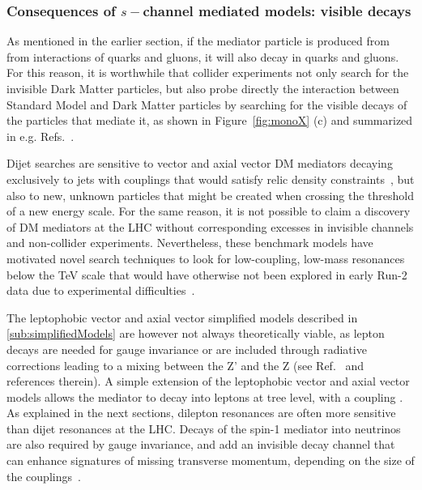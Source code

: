 \subsubsection{Consequences of $s-$channel mediated models: visible decays}
\label{sec:MediatorSearches}

As mentioned in the earlier section, if the mediator particle is produced from from interactions of
quarks and gluons, it will also decay in quarks and gluons. 
For this reason, it is worthwhile that collider experiments not only search for
the invisible Dark Matter particles, but also probe directly the interaction between Standard Model and 
Dark Matter particles by searching for the visible decays of the particles that mediate it, as shown 
in Figure~\ref{fig:monoX} (c) and summarized in e.g. Refs.~\cite{Liew:2016oon,Fairbairn:2016iuf}. 


Dijet searches are sensitive to vector and axial vector DM mediators decaying 
exclusively to jets with couplings that would satisfy relic density constraints~\cite{Chala:2015ama},
but also to new, unknown particles that might be created when crossing 
the threshold of a new energy scale. For the same reason, 
it is not possible to claim a discovery of DM mediators at the LHC without
corresponding excesses in invisible channels and non-collider experiments. 
Nevertheless, these benchmark models have motivated novel search techniques
to look for low-coupling, low-mass resonances below the TeV scale that would
have otherwise not been explored in early Run-2 data due to experimental difficulties~\cite{An:2012ue,Dobrescu:2013coa}. 

The leptophobic vector and axial vector simplified models described in \ref{sub:simplifiedModels} 
are however not always theoretically viable, as lepton decays are needed for gauge invariance
or are included through radiative corrections leading to a mixing between the Z' and the Z 
(see Ref.~\cite{Albert:2017onk} and references therein). A simple extension of the leptophobic vector
and axial vector models allows the mediator to decay into leptons at tree level, with a coupling \gl. 
As explained in the next sections, dilepton resonances are often more sensitive than dijet resonances
at the LHC. Decays of the spin-1 mediator into neutrinos are also required by gauge invariance, and add 
an invisible decay channel that can enhance signatures of missing transverse momentum, depending on
the size of the couplings~\cite{Albert:2017onk}. 

